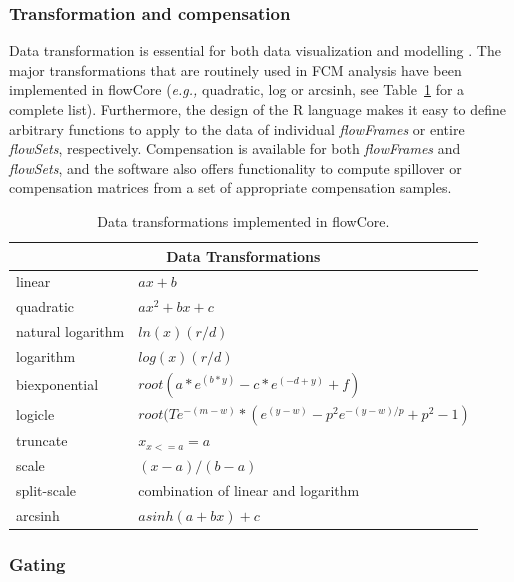 \documentclass[12pt]{article}
\newcommand{\Rpackage}[1]{{\textsf{#1}}}
\newcommand{\Rclass}[1]{{\textit{#1}}}
\begin{document}
\subsubsection*{Transformation and compensation}

Data transformation is essential for both data visualization and
modelling \citep{lo2008agf}. The major transformations that are
routinely used in FCM analysis have been implemented in
\Rpackage{flowCore} (\textit{e.g.,} quadratic, log or arcsinh, see
Table~\ref{table1} for a complete list). Furthermore, the design of
the R language makes it easy to define arbitrary functions to apply to
the data of individual \Rclass{flowFrames} or entire
\Rclass{flowSets}, respectively. Compensation is available for both
\Rclass{flowFrames} and \Rclass{flowSets}, and the software also
offers functionality to compute spillover or compensation matrices
from a set of appropriate compensation samples.

\begin{table}[ht]
\begin{center}
\begin{tabular}{|l|l|}
\hline
\multicolumn{2}{|c|}{Data Transformations} \\
\hline
linear & $ax + b$ \\
quadratic & $ax^2 + bx + c$ \\
natural logarithm & $ln(x)(r/d)$ \\
logarithm & $log(x)(r/d)$ \\
biexponential & $root(a*e^{(b*y)}-c*e^{(-d+y)}+f)$ \\
logicle& $root(Te^{-(m-w)}*(e^{(y-w)}-p^2e^{-(y-w)/p}+p^2-1)$ \\
truncate & $x_{x<=a} = a$ \\
scale & $(x-a)/(b-a)$ \\
split-scale & combination of linear and logarithm \\
arcsinh & $asinh(a + bx)+c$ \\
\hline
\end{tabular}
\caption{\label{table1}Data transformations implemented in
  \Rpackage{flowCore}.}
\end{center}
\end{table}

\subsubsection*{Gating}
\end{document}
